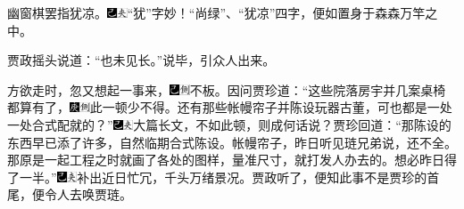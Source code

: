 幽窗棋罢指犹凉。{\includegraphics[width=3mm]{../Images/00003}\includegraphics[width=3mm]{../Images/00012}\footnotesize \kaishu “犹”字妙！“尚绿”、“犹凉”四字，便如置身于森森万竿之中。}

贾政摇头说道：“也未见长。”说毕，引众人出来。

方欲走时，忽又想起一事来，{\includegraphics[width=3mm]{../Images/00003}\includegraphics[width=3mm]{../Images/00011}\footnotesize \kaishu 不板。}因问贾珍道：“这些院落房宇并几案桌椅都算有了，{\includegraphics[width=3mm]{../Images/00004}\includegraphics[width=3mm]{../Images/00011}\footnotesize \kaishu 此一顿少不得。}还有那些帐幔帘子并陈设玩器古董，可也都是一处一处合式配就的？”{\includegraphics[width=3mm]{../Images/00003}\includegraphics[width=3mm]{../Images/00012}\footnotesize \kaishu 大篇长文，不如此顿，则成何话说？}贾珍回道：“那陈设的东西早已添了许多，自然临期合式陈设。帐幔帘子，昨日听见琏兄弟说，还不全。那原是一起工程之时就画了各处的图样，量准尺寸，就打发人办去的。想必昨日得了一半。”{\includegraphics[width=3mm]{../Images/00003}\includegraphics[width=3mm]{../Images/00012}\footnotesize \kaishu 补出近日忙冗，千头万绪景况。}贾政听了，便知此事不是贾珍的首尾，便令人去唤贾琏。

